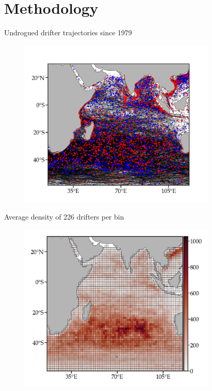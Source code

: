 \documentclass{beamer}
\begin{document}
\section{Methodology}
\begin{frame}{Undrogued drifter trajectories since 1979}  

\begin{figure}[hbt]
  \includegraphics[width=0.85\textwidth]{figures/ioce-trajectories.png}
\end{figure}

\end{frame}

\begin{frame}{Average density of 226 drifters per bin}
\begin{figure}[hbt]
\includegraphics[width=0.85\textwidth]{figures/density.png}

\end{figure}
\end{frame}
\end{document}
